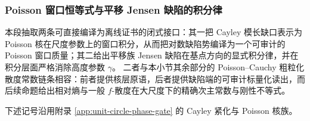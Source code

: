 \subsubsection{Poisson 窗口恒等式与平移 Jensen 缺陷的积分律}\label{subsubsec:cdim-poisson-window-jensen-defect}
本段抽取两条可直接编译为离线证书的闭式接口：其一把 Cayley 模长缺口表示为 Poisson 核在尺度参数上的窗口积分，从而把对数缺陷势编译为一个可审计的 Poisson 窗口质量；其二给出平移族 Jensen 缺陷在基点方向的显式积分律，并在积分层面严格消除高度参数 \(\gamma\)。
二者与本小节其余部分的 Poisson--Cauchy 粗粒化散度常数链条相容：前者提供核层原语，后者提供缺陷端的可审计标量化读出，而后续命题给出相对熵与一般 \(f\)-散度在大尺度下的精确次主常数与刚性不等式。
\par
下述记号沿用附录 \ref{app:unit-circle-phase-gate} 的 Cayley 紧化与 Poisson 核族。

